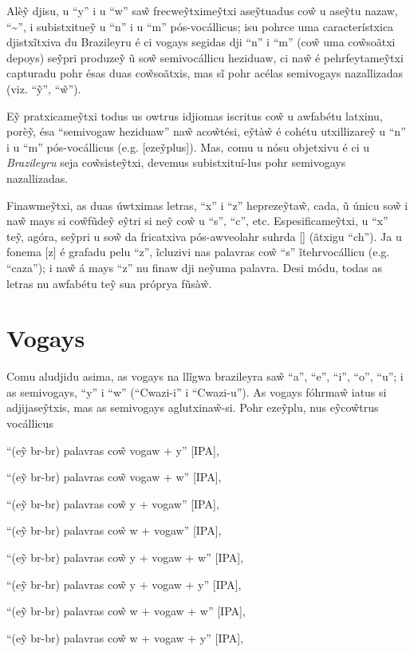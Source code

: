 \documentclass[12pt, a5paper, titlepage]{article}
\begin{document}
\begin{bilingualpages}
    Alè\~y djisu, u ``y'' i u ``w'' sa\~w frecwe\~ytxime\~ytxi ase\~ytuadus co\~w u
    ase\~ytu nazaw, ``\textasciitilde'', i subistxitue\~y u ``n'' i u ``m''
    pós-vocállicus; isu pohrce uma característxica djistxĩtxiva du Brazileyru é ci
    vogays segidas dji ``n'' i ``m'' (co\~w uma co\~wsoãtxi depoys) se\~ypri
    produze\~y ũ so\~w semivocállicu heziduaw, ci na\~w é pehrfeytame\~ytxi
    capturadu pohr ésas duas co\~wsoãtxis, mas sĩ pohr acélas semivogays
    nazallizadas (viz. ``\~y'', ``\~w'').

    E\~y pratxicame\~ytxi todus us owtrus idjiomas iscritus co\~w u awfabétu
    latxinu, porè\~y, ésa ``semivogaw heziduaw'' na\~w aco\~wtési, e\~ytà\~w é
    cohétu utxillizare\~y u ``n'' i u ``m'' pós-vocállicus (e.g. [eze\~yplus]).
    Mas, comu u nósu objetxivu é ci u \textit{Brazileyru} seja co\~wsiste\~ytxi,
    devemus subistxituí-lus pohr semivogays nazallizadas.

    Finawme\~ytxi, as duas úwtximas letras, ``x'' i ``z'' hepreze\~yta\~w, cada, ũ
    únicu so\~w i na\~w mays si co\~wfũde\~y e\~ytri si ne\~y co\~w u ``s'', ``c'',
    etc. Espesificame\~ytxi, u ``x'' te\~y, agóra, se\~ypri u so\~w da fricatxiva
    pós-awveolahr suhrda [\textesh] (ãtxigu ``ch''). Ja u fonema [z] é grafadu pelu
    ``z'', ĩcluzivi nas palavras co\~w ``s'' ĩtehrvocállicu (e.g. ``caza''); i
    na\~w á mays ``z'' nu finaw dji ne\~yuma palavra. Desi módu, todas as letras nu
    awfabétu te\~y sua próprya fũsà\~w.

    \section{Vogays}
    Comu aludjidu asima, as vogays na llĩgwa brazileyra sa\~w ``a'', ``e'', ``i'',
    ``o'', ``u''; i as semivogays, ``y'' i ``w'' (``Cwazi-i'' i ``Cwazi-u''). As
    vogays fóhrma\~w iatus si adjijase\~ytxis, mas as semivogays aglutxina\~w-si. Pohr eze\~yplu, nus e\~yco\~wtrus vocállicus
    \newline
    \par ``(e\~y br-br) palavras co\~w vogaw + y'' {[IPA]},
    \par ``(e\~y br-br) palavras co\~w vogaw + w'' {[IPA]},
    \par ``(e\~y br-br) palavras co\~w y + vogaw'' {[IPA]},
    \par ``(e\~y br-br) palavras co\~w w + vogaw'' {[IPA]},
    \par ``(e\~y br-br) palavras co\~w y + vogaw + w'' {[IPA]},
    \par ``(e\~y br-br) palavras co\~w y + vogaw + y'' {[IPA]},
    \par ``(e\~y br-br) palavras co\~w w + vogaw + w'' {[IPA]},
    \par ``(e\~y br-br) palavras co\~w w + vogaw + y'' {[IPA]},
    \newline


\end{bilingualpages}
\end{document}
